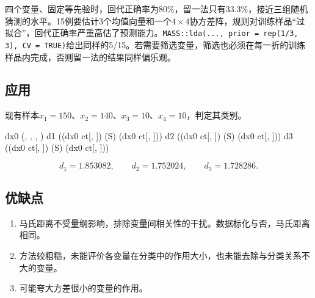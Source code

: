 四个变量、固定等先验时，回代正确率为80\%，留一法只有33.3\%，接近三组随机猜测的水平。15例要估计3个均值向量和一个$4\times4$协方差阵，规则对训练样品“过拟合”，回代正确率严重高估了预测能力。\texttt{MASS::lda(..., prior = rep(1/3, 3), CV = TRUE)}给出同样的5/15。若需要筛选变量，筛选也必须在每一折的训练样品内完成，否则留一法的结果同样偏乐观。
\subsection{应用}
现有样本$x_1=150$、$x_2=140$、$x_3=10$、$x_4=10$，判定其类别。
\begin{code}
dx0 \ROperator{<-} (, , , )
d1 \ROperator{<-} ((dx0 \ROperator{-} ct[, ]) \ROperator{\%*\%} (S) \ROperator{\%*\%} (dx0 \ROperator{-} ct[, ]))
d2 \ROperator{<-} ((dx0 \ROperator{-} ct[, ]) \ROperator{\%*\%} (S) \ROperator{\%*\%} (dx0 \ROperator{-} ct[, ]))
d3 \ROperator{<-} ((dx0 \ROperator{-} ct[, ]) \ROperator{\%*\%} (S) \ROperator{\%*\%} (dx0 \ROperator{-} ct[, ]))
\end{code}
\[
d_1=1.853082,\qquad d_2=1.752024,\qquad d_3=1.728286.
\]
\subsection{优缺点}
\begin{enumerate}
\item 马氏距离不受量纲影响，排除变量间相关性的干扰。数据标化与否，马氏距离相同。
\item 方法较粗糙，未能评价各变量在分类中的作用大小，也未能去除与分类关系不大的变量。
\item 可能夸大方差很小的变量的作用。
\end{enumerate}
